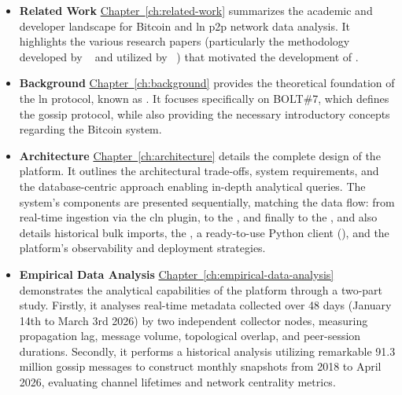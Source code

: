 \begin{itemize}
    \item \textbf{Related Work}  
        \hyperref[ch:related-work]{Chapter~\ref*{ch:related-work}} summarizes the academic and developer landscape for Bitcoin and \gls{ln} \gls{p2p} network data analysis. 
        It highlights the various research papers (particularly the  methodology developed by \citeauthor{decker_lnresearch_2020}~\cite{decker_lnresearch_2020} 
        and utilized by \citeauthor{zabka_empirical_2022}~\cite{zabka_empirical_2022}) that motivated the development of .
    
    \item \textbf{Background} 
        \hyperref[ch:background]{Chapter~\ref*{ch:background}} provides the theoretical foundation of the \gls{ln} protocol, known as . 
        It focuses specifically on BOLT\#7, which defines the gossip protocol, 
        while also providing the necessary introductory concepts regarding the Bitcoin system.
    
    \item \textbf{Architecture} 
        \hyperref[ch:architecture]{Chapter~\ref*{ch:architecture}} details the complete design of the  platform. 
        It outlines the architectural trade-offs, system requirements, and the database-centric approach
        enabling in-depth analytical queries. 
        The system's components are presented sequentially, matching the data flow: 
        from real-time ingestion via the  \gls{cln} plugin, 
        to the , and finally to the ,
        and also details historical bulk imports,
        the  , 
        a ready-to-use Python client (), 
        and the platform's observability and deployment strategies.
    
    \item \textbf{Empirical Data Analysis} 
        \hyperref[ch:empirical-data-analysis]{Chapter~\ref*{ch:empirical-data-analysis}} demonstrates the analytical capabilities of the platform through a two-part study. 
        Firstly, it analyses real-time metadata collected over 48 days (January 14th to March 3rd 2026) 
        by two independent collector nodes, measuring propagation lag, message volume, topological overlap, and peer-session durations. 
        Secondly, it performs a historical analysis utilizing remarkable \num{91.3} million gossip messages 
        to construct monthly snapshots from 2018 to April 2026, evaluating channel lifetimes and network centrality metrics.
    

\end{itemize}
